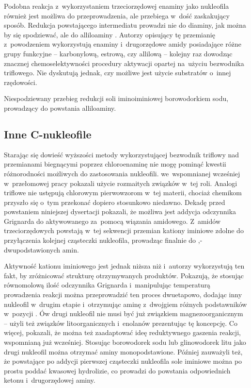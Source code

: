 Podobna reakcja z~wykorzystaniem trzeciorzędowej enaminy  jako nukleofila również jest możliwa do przeprowadzenia,
  ale przebiega w~dość zaskakujący sposób.
Redukcja powstającego intermediatu  prowadzi nie do diaminy,
  jak można by się spodziewać, ale do alliloaminy \autocite{huang18}.
Autorzy opisujący tę przemianię z~powodzeniem wykorzystują enaminy i~drugorzędowe amidy posiadające różne grupy funkcyjne \---
  karbonylową, estrową, czy allilową \--- kolejny raz dowodząc znacznej chemoselektywności procedury aktywacji opartej na~użyciu bezwodnika triflowego.
Nie dyskutują jednak, czy możliwe jest użycie substratów o~innej rzędowości.
\begin{scheme*}
  \centering
  
  \caption{
    Niespodziewany przebieg redukcji soli iminoiminiowej  borowodorkiem sodu,
    prowadzący do powstania alliloaminy.
  }
  \label{sch:allyloamine-synthesis}
\end{scheme*}

\subsection{Inne C-nukleofile}
Starając się dowieść wyższości metody wykorzystującej bezwodnik triflowy nad przemianami biegnącymi
  poprzez chloroenaminę nie mogę pominąć kwestii różnorodności możliwych do zastosowania nukleofili.
\citeauthor{ghosez69} we~wspomnianej wcześniej w~przełomowej pracy\autocite{ghosez69} pokazali użycie rozmaitych związków w~tej roli.
Analogi triflowe nie ustępują chlorowym pierwowzorom w~tej materii, chociaż chemikom przyszło się o~tym przekonać dopiero stosunkowo niedawno.
Dekadę przed powstaniem niniejszej dysertacji \citeauthor{xiao10} pokazali,
  że możliwa jest addycja odczynnika Grignarda do aktywowanego za~pomocą  wiązania amidowego\autocite{xiao10}.
Z~amidów trzeciorzędowych powstają w~tej sekwencji przemian kationy iminiowe zdolne do przyłączenia kolejnej cząsteczki nukleofila,
  prowadząc finalnie do \textalpha,\textalpha-dwupodstawionych amin.

Aktywność kationu iminiowego jest jednak niższa niż  i~autorzy wykorzystują ten fakt,
  by zróżnicować strukturę otrzymywanych produktów.
Pokazują, że stosując równomolową ilość odczynnika Grignarda i~manipulując temperaturą prowadzenia reakcji można przeprowadzić
  ten proces dwuetapowo, dodając inny nukleofil w~drugim etapie i~otrzymując aminę z~dwojgiem różnych podstawników w~pozycji \textalpha.
Ów drugi nukleofil nie musi być już związkiem magnezoorganicznym \---
  \citeauthor{xiao10} użyli też związków litoorganicznych i~enolanów prezentując tę koncepcję\autocite{xiao10}.
Co więcej, pokazali, że można też zaadaptować ideę reduktywnego gaszenia reakcji, wspomnianą już wcześniej\autocite{belanger15}.
Stosując borowodorek sodu lub glinowodorek litu jako drugi nukleofil można otrzymać aminy monopodstawione\autocite{xiao10eurj}.
Później zauważyli też, że powstające po addycji pierwszej cząsteczki nukleofila sole iminiowe 
  można po prostu poddać kwasowej hydrolizie, co prowadzi do powstania odpowiednich ketonu i~drugorzędowej aminy\autocite{huang15tet}.

